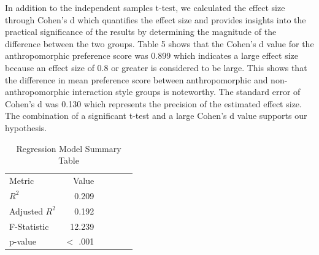 \documentclass[conference]{IEEEtran}
\begin{document}
In addition to the independent samples t-test, we calculated the effect size through Cohen’s d which quantifies the effect size and provides insights into the practical significance of the results by determining the magnitude of the difference between the two groups. Table 5 shows that the Cohen’s d value for the anthropomorphic preference score was 0.899 which indicates a large effect size because an effect size of 0.8 or greater is considered to be large. This shows that the difference in mean preference score between anthropomorphic and non-anthropomorphic interaction style groups is noteworthy. The standard error of Cohen’s d was 0.130 which represents the precision of the estimated effect size. The combination of a significant t-test and a large Cohen's d value supports our hypothesis.

\begin{table}[h]
    \centering
    \caption{Regression Coefficients Table}
    \label{tab:regressionCoefficientsTable}
\end{table}

\begin{table}[h]
    \centering
    \caption{Regression Model Summary Table}
    \label{tab:regressionModelSummaryTable}
        \begin{tabular}{lrrrrr}
            \toprule
            Metric & Value  \\
            \cmidrule[0.4pt]{1-2}
            $R^2$ & 0.209 \\
            Adjusted $R^2$  & 0.192 \\
            F-Statistic & 12.239\\
            p-value & $<$ .001 \\
            \bottomrule
        \end{tabular}
\end{table}
\end{document}
